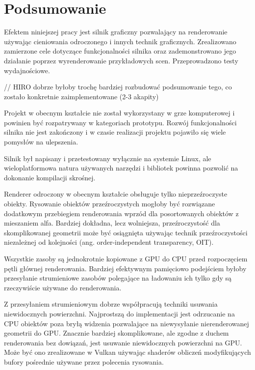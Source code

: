 \chapter{Podsumowanie}
\label{chap:summary}

Efektem niniejszej pracy jest silnik graficzny pozwalający na renderowanie używając cieniowania odroczonego i innych technik graficznych.
Zrealizowano zamierzone cele dotyczące funkcjonalności silnika oraz zademonstrowano jego działanie poprzez wyrenderowanie przykładowych scen. Przeprowadzono testy wydajnościowe.

// HIRO dobrze byłoby trochę bardziej rozbudować podsumowanie tego, co zostało konkretnie zaimplementowane (2-3 akapity)



Projekt w obecnym kształcie nie został wykorzystany w grze komputerowej i powinien być rozpatrywany w kategoriach prototypu.
Rozwój funkcjonalności silnika nie jest zakończony i w czasie realizacji projektu pojawiło się wiele pomysłów na ulepszenia.

Silnik był napisany i przetestowany wyłącznie na systemie Linux, ale wieloplatformowa natura używanych narzędzi i bibliotek powinna pozwolić na dokonanie kompilacji skrośnej.

Renderer odroczony w obecnym kształcie obsługuje tylko nieprzeźroczyste obiekty. Rysowanie obiektów przeźroczystych mogłoby być rozwiązane dodatkowym przebiegiem renderowania wprzód dla posortowanych obiektów z mieszaniem alfa. Bardziej dokładna, lecz wolniejsza, przeźroczystość dla skomplikowanej geometrii może być osiągnięta używając technik przeźroczystości niezależnej od kolejności (ang. order-independent transparency, OIT).

Wszystkie zasoby są jednokrotnie kopiowane z GPU do CPU przed rozpoczęciem pętli głównej renderowania.
Bardziej efektywnym pamięciowo podejściem byłoby przesyłanie strumieniowe zasobów polegające na ładowaniu ich tylko gdy są rzeczywiście używane do renderowania.

Z przesyłaniem strumieniowym dobrze współpracują techniki usuwania niewidocznych powierzchni.
Najprostszą do implementacji jest odrzucanie na CPU obiektów poza bryłą widzenia pozwalające na niewysyłanie nierenderowanej geometrii do GPU.
Znacznie bardziej skomplikowane, ale zgodne z duchem renderowania bez dowiązań, jest usuwanie niewidocznych powierzchni na GPU. Może być ono zrealizowane w Vulkan używając shaderów obliczeń modyfikujących bufory pośrednie używane przez polecenia rysowania.

